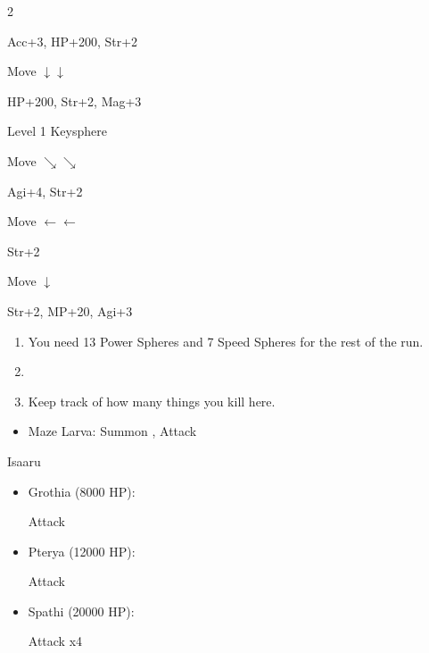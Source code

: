 \begin{spheregrid}
\begin{itemize}
\begin{itemize}
\begin{multicols}{2}
                \item Acc+3, HP+200, Str+2
                \item Move $\downarrow\downarrow$
                \item HP+200, Str+2, Mag+3
                \item Level 1 Keysphere
                \item Move $\searrow\searrow$
                \item Agi+4, Str+2
                \item Move $\leftarrow\leftarrow$
                \item Str+2
                \item Move $\downarrow$
                \item Str+2, MP+20, Agi+3
            \end{multicols}
        \end{itemize}
    \end{itemize}
\end{spheregrid}
\begin{enumerate}[resume]
    \item You need 13 Power Spheres and 7 Speed Spheres for the rest of the run.
    \item \save
    \item Keep track of how many things you kill here.
\end{enumerate}
\begin{encounters}
    \begin{itemize}
        \item Maze Larva: Summon \ixion, Attack
    \end{itemize}
\end{encounters}
\begin{battle}{Isaaru}
    \begin{itemize}
        \item Grothia (8000 HP):
        \begin{itemize}
            \summon{\bahamut}
            \bahamutf Attack
        \end{itemize}
        \item Pterya (12000 HP):
        \begin{itemize}
            \summon{\bahamut}
            \bahamutf Attack
        \end{itemize}
        \item Spathi (20000 HP):
        \begin{itemize}
            \summon{\ixion}
            \ixionf Attack x4
        \end{itemize}
    \end{itemize}
\end{battle}
